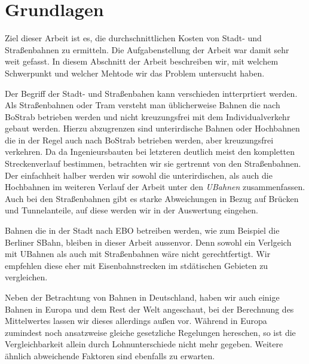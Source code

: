 \section{Grundlagen}

Ziel dieser Arbeit ist es, die durchschnittlichen Kosten von Stadt- und
Straßenbahnen zu ermitteln. Die Aufgabenstellung der Arbeit war damit sehr weit
gefasst. In diesem Abschnitt der Arbeit beschreiben wir, mit welchem Schwerpunkt
und welcher Mehtode wir das Problem untersucht haben.

Der Begriff der Stadt- und Straßenbahen kann verschieden intterprtiert
werden. Als Straßenbahnen oder Tram versteht man üblicherweise Bahnen die nach
BoStrab \cite{bostrab} betrieben werden und nicht kreuzungsfrei mit dem
Individualverkehr gebaut werden. Hierzu abzugrenzen sind unterirdische Bahnen
oder Hochbahnen die in der Regel auch nach BoStrab betrieben werden, aber
kreuzungsfrei verkehren. Da da Ingenieursbauten bei letzteren deutlich meist den
kompletten Streckenverlauf bestimmen, betrachten wir sie gertrennt von den
Straßenbahnen. Der einfachheit halber werden wir sowohl die unterirdischen, als
auch die Hochbahnen im weiteren Verlauf der Arbeit unter den \emph{UBahnen}
zusammenfassen. Auch bei den Straßenbahnen gibt es starke Abweichungen in Bezug
auf Brücken und Tunnelanteile, auf diese werden wir in der Auswertung eingehen.

Bahnen die in der Stadt nach EBO \cite{EBO} betreiben werden, wie zum Beispiel
die Berliner SBahn, bleiben in dieser Arbeit aussenvor. Denn sowohl ein
Verlgeich mit UBahnen als auch mit Straßenbahnen wäre nicht gerechtfertigt. Wir
empfehlen diese eher mit Eisenbahnstrecken im stdätischen Gebieten zu
vergleichen.

Neben der Betrachtung von Bahnen in Deutschland, haben wir auch einige Bahnen in
Europa und dem Rest der Welt angeschaut, bei der Berechnung des Mittelwertes
lassen wir dieses allerdings außen vor. Während in Europa zumindest noch
ansatzweise gleiche gesetzliche Regelungen hereschen, so ist die
Vergleichbarkeit allein durch Lohnunterschiede nicht mehr gegeben. Weitere
ähnlich abweichende Faktoren sind ebenfalls zu erwarten.

